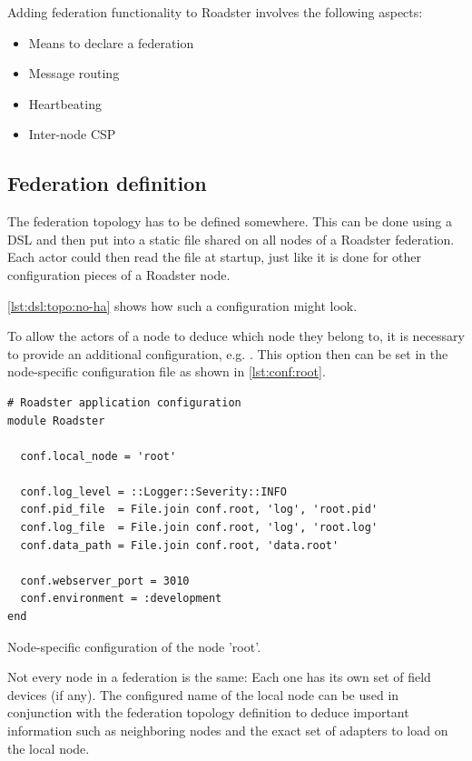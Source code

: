 Adding federation functionality to Roadster involves the following aspects:
\begin{itemize}
	\item Means to declare a federation
	\item Message routing
	\item Heartbeating
	\item Inter-node CSP
\end{itemize}

\subsection{Federation definition}
The federation topology has to be defined somewhere. This can be done using a
\gls{DSL} and then put into a static file shared
on all nodes of a Roadster federation. Each actor could then read the file at
startup, just like it is done for other configuration pieces of a Roadster node.

\autoref{lst:dsl:topo:no-ha} shows how such a configuration might look.

To allow the actors of a node to deduce which node they belong to, it is
necessary to provide an additional configuration, e.g. .
This option then can be set in the node-specific configuration file as shown in
\autoref{lst:conf:root}.

\begin{listing}
	\begin{verbatim}
# Roadster application configuration
module Roadster

  conf.local_node = 'root'

  conf.log_level = ::Logger::Severity::INFO
  conf.pid_file  = File.join conf.root, 'log', 'root.pid'
  conf.log_file  = File.join conf.root, 'log', 'root.log'
  conf.data_path = File.join conf.root, 'data.root'

  conf.webserver_port = 3010
  conf.environment = :development
end
	\end{verbatim}
	\caption{Node-specific configuration of the node 'root'.}
	\label{lst:conf:root}
\end{listing}

Not every node in a federation is the same: Each one has its own set of field devices (if any).
The configured name of the local node can be used in conjunction with the
federation topology definition to deduce important information such as neighboring
nodes and the exact set of adapters to load on the local node.

